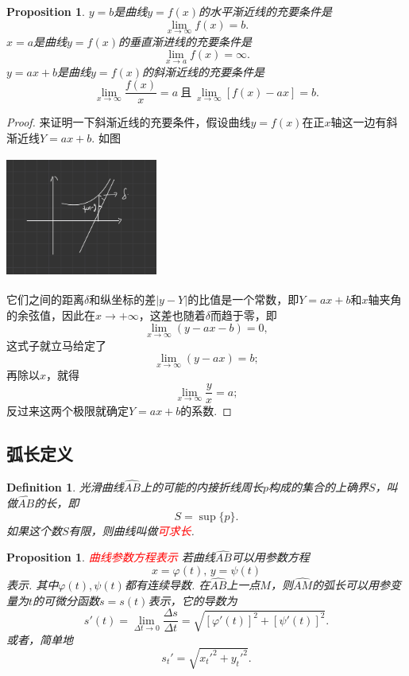 \documentclass{article}
\newtheorem{proposition}[theorem]{Proposition}
\newtheorem{definition}[theorem]{Definition}
\newcommand{\redt}[1]{\textcolor{red}{#1}}
\begin{document}
\begin{proposition}
\rm $y=b$是曲线$y=f(x)$的水平渐近线的充要条件是
$$
\lim\limits_{x \to \infty} f(x)= b.
$$
$x=a$是曲线$y=f(x)$的垂直渐进线的充要条件是
$$
\lim\limits_{x \to a} f(x) = \infty.
$$
$y=ax+b$是曲线$y=f(x)$的斜渐近线的充要条件是
$$
\lim\limits_{x \to \infty} \frac{f(x)}{x} = a ~\text{且}~ \lim\limits_{x \to  \infty} [f(x)-ax ] =b.
$$
\end{proposition}

\begin{proof}
来证明一下斜渐近线的充要条件，假设曲线$y=f(x)$在正$x$轴这一边有斜渐近线$Y=ax+b$. 如图
\begin{center}
\includegraphics[width=5cm, height=4cm]{images/asymptotic_line.jpg}
\end{center}
它们之间的距离$\delta$和纵坐标的差$|y-Y|$的比值是一个常数，即$Y=ax+b$和$x$轴夹角的余弦值，因此在$x \to +\infty$，这差也随着$\delta$而趋于零，即
$$
\lim\limits_{x \to \infty} (y-ax-b) = 0,
$$
这式子就立马给定了
$$
\lim\limits_{x \to \infty} (y-ax) =b;
$$
再除以$x$，就得
$$
\lim\limits_{x \to \infty} \frac{y}{x} = a;
$$
反过来这两个极限就确定$Y=ax+b$的系数. 
\end{proof}

\subsection{弧长定义}

\begin{definition}
\rm 光滑曲线$\widehat{AB}$上的可能的内接折线周长$p$构成的集合的上确界$S$，叫做$\widehat{AB}$的长，即
$$
S = \sup\{p\}.
$$
如果这个数$S$有限，则曲线叫做\redt{可求长}.
\end{definition}

\begin{proposition}
\rm \redt{曲线参数方程表示} 若曲线$\widehat{AB}$可以用参数方程
$$
x = \varphi(t), \, y = \psi(t) 
$$
表示. 其中$\varphi(t),\psi(t)$都有连续导数. 在$\widehat{AB}$上一点$M$，则$\widehat{AM}$的弧长可以用参变量为$t$的可微分函数$s = s(t)$表示，它的导数为
$$
s'(t) = \lim\limits_{\Delta t \to 0}\frac{\Delta s}{\Delta t} = \sqrt{[\varphi'(t)]^2+[\psi'(t)]^2}.
$$
或者，简单地
$$
s_t' = \sqrt{x_t'^2 + y_t'^2}. 
$$
\end{proposition}
\end{document}
